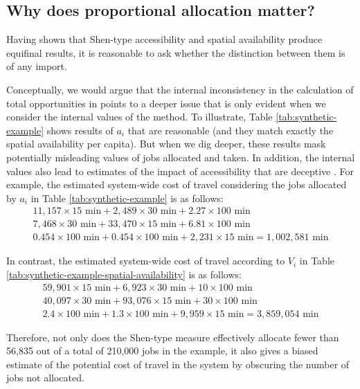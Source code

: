 \documentclass[]{elsarticle} %
\begin{document}
\hypertarget{why-does-proportional-allocation-matter}{%
\subsection{Why does proportional allocation
matter?}\label{why-does-proportional-allocation-matter}}

Having shown that Shen-type accessibility and spatial availability
produce equifinal results, it is reasonable to ask whether the
distinction between them is of any import.

Conceptually, we would argue that the internal inconsistency in the
calculation of total opportunities in \citet{shen1998} points to a
deeper issue that is only evident when we consider the internal values
of the method. To illustrate, Table \ref{tab:synthetic-example} shows
results of \(a_i\) that are reasonable (and they match exactly the
spatial availability per capita). But when we dig deeper, these results
mask potentially misleading values of jobs allocated and taken. In
addition, the internal values also lead to estimates of the impact of
accessibility that are deceptive \citep[see][]{sarlas_2020_betweenness}.
For example, the estimated system-wide cost of travel considering the
jobs allocated by \(a_i\) in Table \ref{tab:synthetic-example} is as
follows: \[
\begin{array}{l}
11,157\times 15 \text{ min} + 2,489\times 30 \text{ min} + 2.27\times 100 \text{ min}\\
7,468\times 30 \text{ min} + 33,470\times 15 \text{ min} + 6.81\times 100 \text{ min}\\
0.454\times 100 \text{ min} + 0.454\times 100 \text{ min} + 2,231\times 15 \text{ min} = 1,002,581\text{ min}
\end{array}
\]

In contrast, the estimated system-wide cost of travel according to
\(V_i\) in Table \ref{tab:synthetic-example-spatial-availability} is as
follows: \[
\begin{array}{l}
59,901\times 15 \text{ min} + 6,923\times 30 \text{ min} + 10\times 100 \text{ min}\\
40,097\times 30 \text{ min} + 93,076\times 15 \text{ min} + 30\times 100 \text{ min}\\
2.4\times 100 \text{ min} + 1.3\times 100 \text{ min} + 9,959\times 15 \text{ min} = 3,859,054\text{ min}
\end{array}
\]

Therefore, not only does the Shen-type measure effectively allocate
fewer than 56,835 out of a total of 210,000 jobs in the example, it also
gives a biased estimate of the potential cost of travel in the system by
obscuring the number of jobs not allocated.
\end{document}
